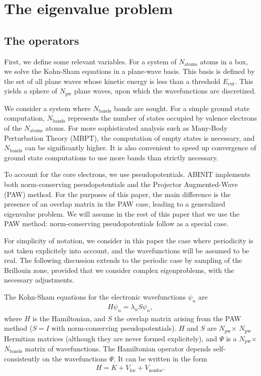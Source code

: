\documentclass[11pt]{elsarticle}
\newcommand{\npw}{\ensuremath{N_{\text{pw}}}\xspace}
\newcommand{\nband}{\ensuremath{N_{\text{bands}}}\xspace}
\newcommand{\natom}{\ensuremath{N_{\text{atoms}}}\xspace}
\begin{document}
\section{The eigenvalue problem}
\subsection{The operators}
First, we define some relevant variables. For a system of $\natom$
atoms in a box, we solve the Kohn-Sham equations in a plane-wave basis. This
basis is defined by the set of all plane waves whose kinetic energy is less
than a threshold $E_{\text{cut}}$. This yields a sphere of $\npw$
plane waves, upon which the wavefunctions are discretized.

We consider a system where \nband bands are sought. For a simple
ground state computation, \nband represents the number of states
occupied by valence electrons of the $\natom$ atoms. For more
sophisticated analysis such as Many-Body Perturbation Theory (MBPT),
the computation of empty states is necessary, and \nband can be
significantly higher. It is also convenient to speed up convergence of
ground state computations to use more bands than strictly necessary.

To account for the core electrons, we use pseudopotentials. ABINIT
implements both norm-conserving pseudopotentials and the Projector
Augmented-Wave (PAW) method. For the purposes of this paper, the main
difference is the presence of an overlap matrix in the PAW case,
leading to a generalized eigenvalue problem. We will assume in the
rest of this paper that we use the PAW method: norm-conserving
pseudopotentials follow as a special case.

For simplicity of notation, we consider in this paper the case where
periodicity is not taken explicitely into account, and the
wavefunctions will be assumed to be real. The following discussion
extends to the periodic case by sampling of the Brillouin zone,
provided that we consider complex eigenproblems, with the necessary
adjustments.

The Kohn-Sham equations for the electronic wavefunctions $\psi_{n}$ are
\begin{align}
  \label{KS}
  H \psi_{n} = \lambda_{n} S \psi_{n},
\end{align}
where $H$ is the Hamiltonian, and $S$ the overlap matrix arising from
the PAW method ($S = I$ with norm-conserving pseudopotentials). $H$
and $S$ are \npw $\times$ \npw Hermitian matrices (although they are
never formed explicitely), and $\Psi$ is a \npw $\times$ \nband matrix
of wavefunctions. The Hamiltonian operator depends self-consistently
on the wavefunctions $\Psi$. It can be written in the form
\begin{align}
  H = K + V_{\text{loc}} + V_{\text{nonloc}}.
\end{align}
\end{document}
